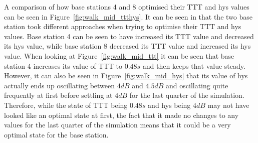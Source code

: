 A comparison of how base stations 4 and 8 optimised their TTT and hys values can be seen in Figure~\ref{fig:walk_mid_ttthys}. It can be seen in that the two base station took different approaches when trying to optimise their TTT and hys values. Base station 4 can be seen to have increased its TTT value and decreased its hys value, while base station 8 decreased its TTT value and increased its hys value. When looking at Figure~\ref{fig:walk_mid_ttt} it can be seen that base station 4 increases its value of TTT to $0.48 s$ and then keeps that value steady. However, it can also be seen in Figure~\ref{fig:walk_mid_hys} that its value of hys actually ends up oscillating between $4 dB$ and $4.5 dB$ and oscillating quite frequently at first before settling at $4 dB$ for the last quarter of the simulation. Therefore, while the state of TTT being $0.48 s$ and hys being $4 dB$ may not have looked like an optimal state at first, the fact that it made no changes to any values for the last quarter of the simulation means that it could be a very optimal state for the base station.

